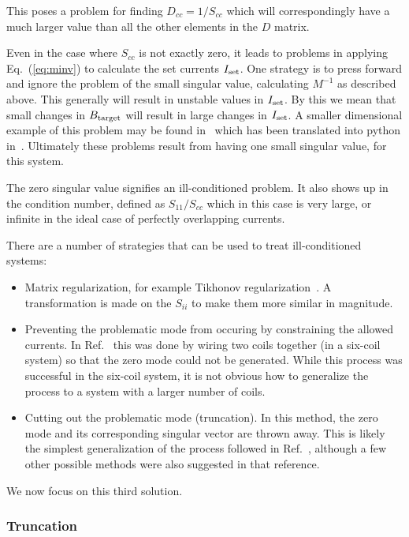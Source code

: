 \documentclass[preprint,12pt]{elsarticle}
\begin{document}
This poses a problem for finding $D_{cc}=1/S_{cc}$ which will
correspondingly have a much larger value than all the other elements
in the $D$ matrix.

Even in the case where $S_{cc}$ is not exactly zero, it leads to
problems in applying Eq.~(\ref{eq:minv}) to calculate the set currents
$I_{\rm set}$.  One strategy is to press forward and ignore the
problem of the small singular value, calculating $M^{-1}$ as described
above.  This generally will result in unstable values in $I_{\rm
  set}$.  By this we mean that small changes in $B_{\rm target}$ will
result in large changes in $I_{\rm set}$.  A smaller dimensional
example of this problem may be found in~\cite{bib:gregorcic} which has
been translated into python in~\cite{bib:test}.  Ultimately these
problems result from having one small singular value, for this system.

The zero singular value signifies an ill-conditioned problem.  It also
shows up in the condition number, defined as $S_{11}/S_{cc}$ which in
this case is very large, or infinite in the ideal case of perfectly
overlapping currents.

There are a number of strategies that can be used to treat
ill-conditioned systems:
\begin{itemize}
  \item Matrix regularization, for example Tikhonov
    regularization~\cite{bib:franke}.  A transformation is made on the
    $S_{ii}$ to make them more similar in magnitude.
  \item Preventing the problematic mode from occuring by constraining
    the allowed currents.  In Ref.~\cite{bib:shomithesis} this was
    done by wiring two coils together (in a six-coil system) so that
    the zero mode could not be generated.  While this process was
    successful in the six-coil system, it is not obvious how to
    generalize the process to a system with a larger number of coils.
  \item Cutting out the problematic mode (truncation).  In this
    method, the zero mode and its corresponding singular vector are
    thrown away.  This is likely the simplest generalization of the
    process followed in Ref.~\cite{bib:shomithesis}, although a few
    other possible methods were also suggested in that reference.
\end{itemize}
We now focus on this third solution.

\subsubsection{Truncation}
\end{document}
